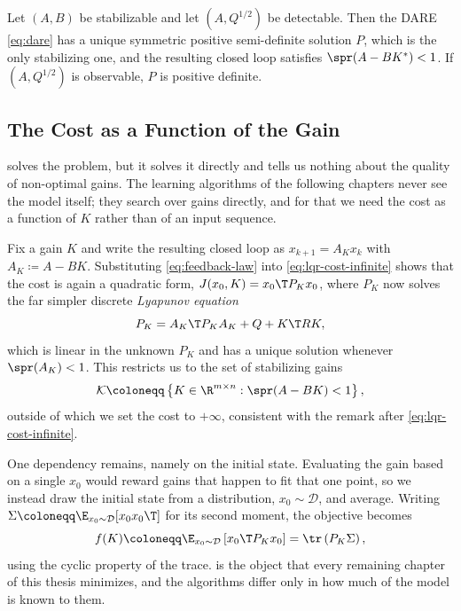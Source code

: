 \begin{theorem}
\label{thm:dare-existence}
Let $(A, B)$ be stabilizable and let $(A, Q^{1/2})$ be detectable. Then the DARE
\eqref{eq:dare} has a unique symmetric positive semi-definite solution $P$, which
is the only stabilizing one, and the resulting closed loop satisfies
$\spr(A - B K^{*}) < 1$. If $(A, Q^{1/2})$ is observable, $P$ is positive
definite.
\end{theorem}

\subsection{The Cost as a Function of the Gain}
\label{subsec:lqr-cost-of-gain}

 solves the problem, but it solves it directly and
tells us nothing about the quality of non-optimal gains. The learning algorithms of
the following chapters never see the model itself; they search over gains
directly, and for that we need the cost as a function of $K$ rather than of an
input sequence.

Fix a gain $K$ and write the resulting closed loop as
$x_{k+1} = A_K x_k$ with $A_K \coloneqq A - BK$. Substituting
\eqref{eq:feedback-law} into \eqref{eq:lqr-cost-infinite} shows that the cost is
again a quadratic form, $J(x_0, K) = x_0\T P_K x_0$, where $P_K$ now solves
the far simpler discrete \emph{Lyapunov equation}
\begin{equation}
    \label{eq:lyapunov}
    P_K = A_K\T P_K A_K + Q + K\T R K ,
\end{equation}
which is linear in the unknown $P_K$ and has a unique solution whenever
$\spr(A_K) < 1$. This restricts us to the set of stabilizing gains
\begin{equation}
    \label{eq:stabilizing-set}
    \mathcal{K} \coloneqq \left\{ K \in \R^{m \times n} : \spr(A - BK) < 1 \right\} ,
\end{equation}
outside of which we set the cost to $+\infty$, consistent with the remark after
\eqref{eq:lqr-cost-infinite}.

One dependency remains, namely on the initial state. Evaluating the gain
based on a single $x_0$ would reward gains that happen to fit that one
point, so we instead draw the initial state from a distribution,
$x_0 \sim \mathcal{D}$, and average. Writing
$\Sigma \coloneqq \E_{x_0 \sim \mathcal{D}}[x_0 x_0\T]$ for its second moment,
the objective becomes
\begin{equation}
    \label{eq:cost-of-gain}
    f(K) \coloneqq \E_{x_0 \sim \mathcal{D}} \left[ x_0\T P_K x_0 \right]
    = \tr \left( P_K \Sigma \right) ,
\end{equation}
using the cyclic property of the trace.  is the object
that every remaining chapter of this thesis minimizes, and the algorithms differ
only in how much of the model is known to them.

